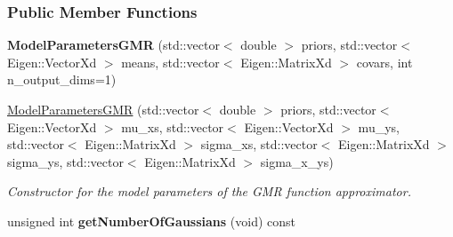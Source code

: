 \subsubsection*{Public Member Functions}
\begin{DoxyCompactItemize}
\item 
\hypertarget{classDmpBbo_1_1ModelParametersGMR_a537f71cbd3b658dc15a722ed9008e9d5}{{\bfseries Model\+Parameters\+G\+M\+R} (std\+::vector$<$ double $>$ priors, std\+::vector$<$ Eigen\+::\+Vector\+Xd $>$ means, std\+::vector$<$ Eigen\+::\+Matrix\+Xd $>$ covars, int n\+\_\+output\+\_\+dims=1)}\label{classDmpBbo_1_1ModelParametersGMR_a537f71cbd3b658dc15a722ed9008e9d5}

\item 
\hypertarget{classDmpBbo_1_1ModelParametersGMR_a248fa3b5f6d86e9316129b73863e9278}{\hyperlink{classDmpBbo_1_1ModelParametersGMR_a248fa3b5f6d86e9316129b73863e9278}{Model\+Parameters\+G\+M\+R} (std\+::vector$<$ double $>$ priors, std\+::vector$<$ Eigen\+::\+Vector\+Xd $>$ mu\+\_\+xs, std\+::vector$<$ Eigen\+::\+Vector\+Xd $>$ mu\+\_\+ys, std\+::vector$<$ Eigen\+::\+Matrix\+Xd $>$ sigma\+\_\+xs, std\+::vector$<$ Eigen\+::\+Matrix\+Xd $>$ sigma\+\_\+ys, std\+::vector$<$ Eigen\+::\+Matrix\+Xd $>$ sigma\+\_\+x\+\_\+ys)}\label{classDmpBbo_1_1ModelParametersGMR_a248fa3b5f6d86e9316129b73863e9278}

\begin{DoxyCompactList}\small\item\em Constructor for the model parameters of the G\+M\+R function approximator. \end{DoxyCompactList}\item 
\hypertarget{classDmpBbo_1_1ModelParametersGMR_a1ab606b9eb475b891b726df05ccd3012}{unsigned int {\bfseries get\+Number\+Of\+Gaussians} (void) const }\label{classDmpBbo_1_1ModelParametersGMR_a1ab606b9eb475b891b726df05ccd3012}


\end{DoxyCompactItemize}
